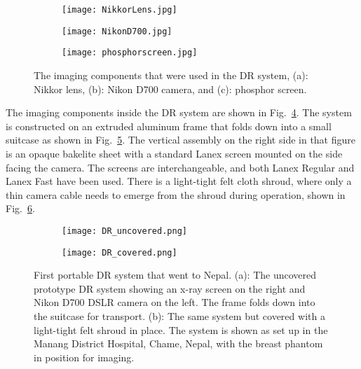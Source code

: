 \begin{figure}[h]
	\begin{subfigure}[b]{0.3\linewidth}
		\centering
		\texttt{[image: NikkorLens.jpg]}
		\caption{}
		\label{fig:nikonlens}
	\end{subfigure}
	\hspace{0.2cm}
	\begin{subfigure}[b]{0.3\linewidth}
		\centering
		\texttt{[image: NikonD700.jpg]}
		\caption{}
		\label{fig:nikoncamera}
	\end{subfigure}
	\hspace{0.2cm}
	\begin{subfigure}[b]{0.3\linewidth}
		\texttt{[image: phosphorscreen.jpg]}
		\caption{}
		\label{fig:phosphorscreen}
	\end{subfigure}
\caption{The imaging components that were used in the DR system, (a): Nikkor lens, (b): Nikon D700 camera, and (c): phosphor screen.}
\label{fig:DRcomponents}
\end{figure}

The imaging components inside the DR system are shown in Fig.~\ref{fig:DRcomponents}.  The system is constructed on an extruded aluminum frame that folds down into a small suitcase as shown in Fig.~\ref{fig:DR1uncovered}. The vertical assembly on the right side in that figure is an opaque bakelite sheet with a standard Lanex screen mounted on the side facing the camera. The screens are interchangeable, and both Lanex Regular and Lanex Fast have been used. There is a light-tight felt cloth shroud, where only a thin camera cable needs to emerge from the shroud during operation, shown in Fig.~\ref{fig:DR1covered}.
%
\begin{figure}[h]
\centering
	\begin{subfigure}[b]{0.45\linewidth}
	\texttt{[image: DR\_uncovered.png]}
	\caption{}
	\label{fig:DR1uncovered}
	\end{subfigure}
\hspace{0.2cm}
	\begin{subfigure}[b]{0.45\linewidth}
	\centering
	\texttt{[image: DR\_covered.png]}
	\caption{}
	\label{fig:DR1covered}
	\end{subfigure}
\caption{First portable DR system that went to Nepal.  (a): The uncovered prototype DR system showing an x-ray screen on the right and Nikon D700 DSLR camera on the left.  The frame folds down into the suitcase for transport.  (b): The same system but covered with a light-tight felt shroud in place.  The system is shown as set up in the Manang District Hospital, Chame, Nepal, with the breast phantom in position for imaging.}
\label{fig:DR1}
\end{figure}

